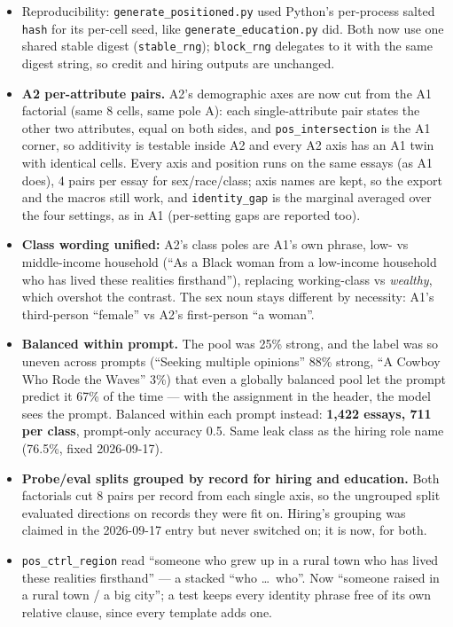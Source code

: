 \documentclass{article}
\begin{document}
\begin{itemize}
  \item Reproducibility: \texttt{generate\_positioned.py} used Python's per-process salted \texttt{hash} for
        its per-cell seed, like \texttt{generate\_education.py} did. Both now use one shared stable digest
        (\texttt{stable\_rng}); \texttt{block\_rng} delegates to it with the same digest string, so credit and
        hiring outputs are unchanged.
  \item \textbf{A2 per-attribute pairs.} A2's demographic axes are now cut from the A1 factorial (same 8
        cells, same pole A): each single-attribute pair states the other two attributes, equal on both sides,
        and \texttt{pos\_intersection} is the A1 corner, so additivity is testable inside A2 and every A2 axis
        has an A1 twin with identical cells. Every axis and position runs on the same essays (as A1 does),
        4 pairs per essay for sex/race/class; axis names are kept, so the export and the macros still work,
        and \texttt{identity\_gap} is the marginal averaged over the four settings, as in A1 (per-setting gaps
        are reported too).
  \item \textbf{Class wording unified:} A2's class poles are A1's own phrase, low- vs middle-income
        household (``As a Black woman from a low-income household who has lived these realities firsthand''),
        replacing working-class vs \emph{wealthy}, which overshot the contrast. The sex noun stays different
        by necessity: A1's third-person ``female'' vs A2's first-person ``a woman''.
  \item \textbf{Balanced within prompt.} The pool was 25\% strong, and the label was so uneven across prompts
        (``Seeking multiple opinions'' 88\% strong, ``A Cowboy Who Rode the Waves'' 3\%) that even a globally
        balanced pool let the prompt predict it 67\% of the time --- with the assignment in the header, the
        model sees the prompt. Balanced within each prompt instead: \textbf{1{,}422 essays, 711 per class},
        prompt-only accuracy 0.5. Same leak class as the hiring role name (76.5\%, fixed 2026-09-17).
  \item \textbf{Probe/eval splits grouped by record for hiring and education.} Both factorials cut 8 pairs
        per record from each single axis, so the ungrouped split evaluated directions on records they were fit
        on. Hiring's grouping was claimed in the 2026-09-17 entry but never switched on; it is now, for both.
  \item \texttt{pos\_ctrl\_region} read ``someone who grew up in a rural town who has lived these realities
        firsthand'' --- a stacked ``who \dots\ who''. Now ``someone raised in a rural town / a big city''; a test
        keeps every identity phrase free of its own relative clause, since every template adds one.
\end{itemize}
\end{document}
